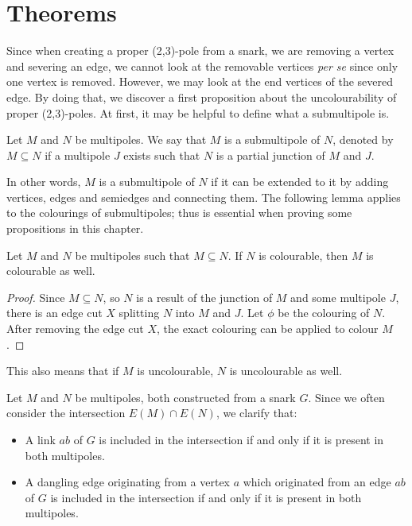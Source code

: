 \section{Theorems}\label{sec:result-theorems}

Since when creating a proper (2,3)-pole from a snark, we are removing a vertex and severing an edge, we cannot look at the removable vertices \textit{per se} since only one vertex is removed. However, we may look at the end vertices of the severed edge. By doing that, we discover a first proposition about the uncolourability of proper (2,3)-poles. At first, it may be helpful to define what a submultipole is.

\begin{definition}
	Let $M$ and $N$ be multipoles. We say that $M$ is a submultipole of $N$, denoted by $M\subseteq N$ if a multipole $J$ exists such that $N$ is a partial junction of $M$ and $J$.
\end{definition}

In other words, $M$ is a submultipole of $N$ if it can be extended to it by adding vertices, edges and semiedges and connecting them. The following lemma applies to the colourings of submultipoles; thus is essential when proving some propositions in this chapter.

\begin{lemma}
	Let $M$ and $N$ be multipoles such that $M\subseteq N$. If $N$ is colourable, then $M$ is colourable as well.
	\label{lem:submultipole-uncolourable}
\end{lemma}

\begin{proof}
	Since $M\subseteq N$, so $N$ is a result of the junction of $M$ and some multipole $J$, there is an edge cut $X$ splitting $N$ into $M$ and $J$. Let $\phi$ be the colouring of $N$. After removing the edge cut $X$, the exact colouring can be applied to colour $M$.
\end{proof}

This also means that if $M$ is uncolourable, $N$ is uncolourable as well.

Let $M$ and $N$ be multipoles, both constructed from a snark $G$. Since we often consider the intersection $E(M)\cap E(N)$, we clarify that:
\begin{itemize}
	\item A link $ab$ of $G$ is included in the intersection if and only if it is present in both multipoles.
	\item A dangling edge originating from a vertex $a$ which originated from an edge $ab$ of $G$ is included in the intersection if and only if it is present in both multipoles.
\end{itemize}


